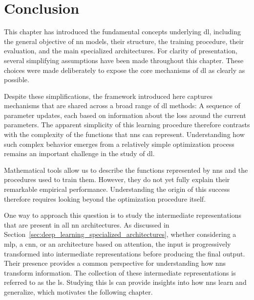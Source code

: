 \section{Conclusion}

\label{sec:deep_learning_conclusion}

This chapter has introduced the fundamental concepts underlying \gls{dl}, including the general objective of \gls{nn} models, their structure, the training procedure, their evaluation, and the main specialized architectures.
For clarity of presentation, several simplifying assumptions have been made throughout this chapter.
These choices were made deliberately to expose the core mechanisms of \gls{dl} as clearly as possible.

Despite these simplifications, the framework introduced here captures mechanisms that are shared across a broad range of \gls{dl} methods:
A sequence of parameter updates, each based on information about the loss around the current parameters.
The apparent simplicity of this learning procedure therefore contrasts with the complexity of the functions that \glspl{nn} can represent.
Understanding how such complex behavior emerges from a relatively simple optimization process remains an important challenge in the study of \gls{dl}.

Mathematical tools allow us to describe the functions represented by \glspl{nn} and the procedures used to train them.
However, they do not yet fully explain their remarkable empirical performance.
Understanding the origin of this success therefore requires looking beyond the optimization procedure itself.

One way to approach this question is to study the intermediate representations that are present in all \gls{nn} architectures.
As discussed in Section~\ref{sec:deep_learning_specialized_architectures}, whether considering a \gls{mlp}, a \gls{cnn}, or an architecture based on attention, the input is progressively transformed into intermediate representations before producing the final output.
Their presence provides a common perspective for understanding how \glspl{nn} transform information.
The collection of these intermediate representations is referred to as the \gls{ls}.
Studying this \gls{ls} can provide insights into how \glspl{nn} learn and generalize, which motivates the following chapter.
